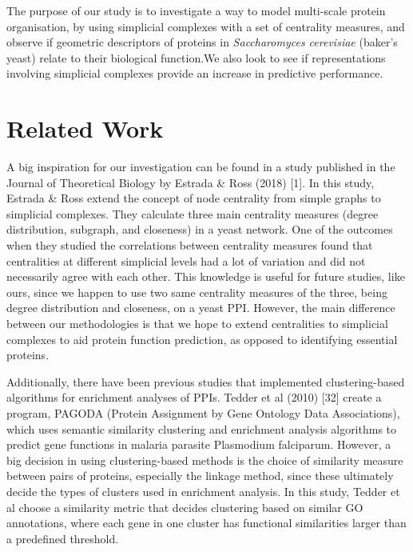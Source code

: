 \documentclass[9pt]{article}
\begin{document}
\par
The purpose of our study is to investigate a way to model multi-scale protein organisation, by using simplicial complexes with a set of centrality measures, and observe if geometric descriptors of proteins in \textit{Saccharomyces cerevisiae} (baker’s yeast) relate to their biological function.We also look to see if representations involving simplicial complexes provide an increase in predictive performance.

\section{Related Work}
A big inspiration for our investigation can be found in a study published in the Journal of Theoretical Biology by Estrada \& Ross (2018) [1]. In this study, Estrada \& Ross extend the concept of node centrality from simple graphs to simplicial complexes. They calculate three main centrality measures (degree distribution, subgraph, and closeness) in a yeast network. One of the outcomes when they studied the correlations between centrality measures found that centralities at different simplicial levels had a lot of variation and did not necessarily agree with each other. This knowledge is useful for future studies, like ours, since we happen to use two same centrality measures of the three, being degree distribution and closeness, on a yeast PPI. However, the main difference between our methodologies is that we hope to extend centralities to simplicial complexes to aid protein function prediction, as opposed to identifying essential proteins.

Additionally, there have been previous studies that implemented clustering-based algorithms for enrichment analyses of PPIs. Tedder et al (2010) [32] create a program, PAGODA (Protein Assignment by Gene Ontology Data Associations), which uses semantic similarity clustering and enrichment analysis algorithms to predict gene functions in malaria parasite Plasmodium falciparum. However, a big decision in using clustering-based methods is the choice of similarity measure between pairs of proteins, especially the linkage method, since these ultimately decide the types of clusters used in enrichment analysis. In this study, Tedder et al choose a similarity metric that decides clustering based on similar GO annotations, where each gene in one cluster has functional similarities larger than a predefined threshold. 
\end{document}

